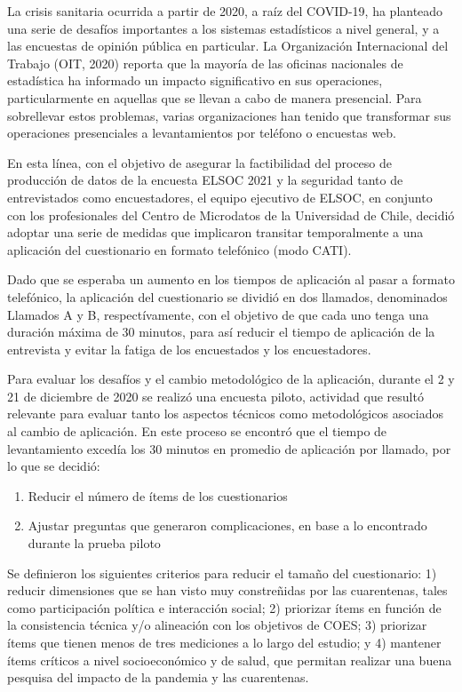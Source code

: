 \documentclass[
  12pt,
]{article}
\providecommand{\tightlist}{%
  \setlength{\itemsep}{0pt}\setlength{\parskip}{0pt}}
\begin{document}
La crisis sanitaria ocurrida a partir de 2020, a raíz del COVID-19, ha planteado una serie de desafíos importantes a los sistemas estadísticos a nivel general, y a las encuestas de opinión pública en particular. La Organización Internacional del Trabajo (OIT, 2020) reporta que la mayoría de las oficinas nacionales de estadística ha informado un impacto significativo en sus operaciones, particularmente en aquellas que se llevan a cabo de manera presencial. Para sobrellevar estos problemas, varias organizaciones han tenido que transformar sus operaciones presenciales a levantamientos por teléfono o encuestas web.

En esta línea, con el objetivo de asegurar la factibilidad del proceso de producción de datos de la encuesta ELSOC 2021 y la seguridad tanto de entrevistados como encuestadores, el equipo ejecutivo de ELSOC, en conjunto con los profesionales del Centro de Microdatos de la Universidad de Chile, decidió adoptar una serie de medidas que implicaron transitar temporalmente a una aplicación del cuestionario en formato telefónico (modo CATI).

Dado que se esperaba un aumento en los tiempos de aplicación al pasar a formato telefónico, la aplicación del cuestionario se dividió en dos llamados, denominados Llamados A y B, respectívamente, con el objetivo de que cada uno tenga una duración máxima de 30 minutos, para así reducir el tiempo de aplicación de la entrevista y evitar la fatiga de los encuestados y los encuestadores.

Para evaluar los desafíos y el cambio metodológico de la aplicación, durante el 2 y 21 de diciembre de 2020 se realizó una encuesta piloto, actividad que resultó relevante para evaluar tanto los aspectos técnicos como metodológicos asociados al cambio de aplicación. En este proceso se encontró que el tiempo de levantamiento excedía los 30 minutos en promedio de aplicación por llamado, por lo que se decidió:

\begin{enumerate}
\def\labelenumi{\arabic{enumi}.}
\tightlist
\item
  Reducir el número de ítems de los cuestionarios
\item
  Ajustar preguntas que generaron complicaciones, en base a lo encontrado durante la prueba piloto
\end{enumerate}

Se definieron los siguientes criterios para reducir el tamaño del cuestionario: 1) reducir dimensiones que se han visto muy constreñidas por las cuarentenas, tales como participación política e interacción social; 2) priorizar ítems en función de la consistencia técnica y/o alineación con los objetivos de COES; 3) priorizar ítems que tienen menos de tres mediciones a lo largo del estudio; y 4) mantener ítems críticos a nivel socioeconómico y de salud, que permitan realizar una buena pesquisa del impacto de la pandemia y las cuarentenas.
\end{document}
